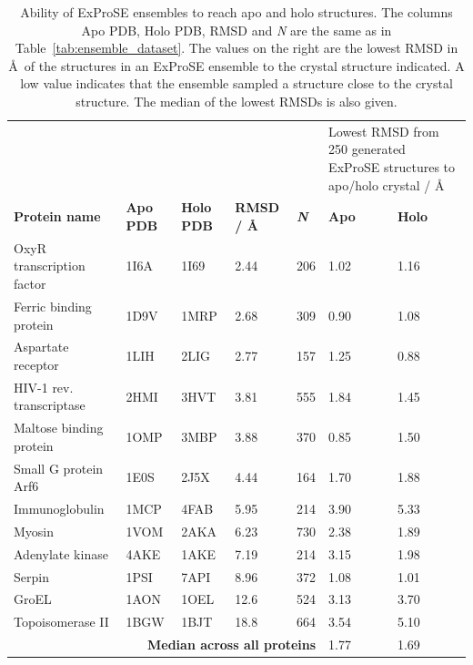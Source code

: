 \begin{table}
\centering

\begin{footnotesize}
\begin{tabular}{ l l l l l l l }
\hline
 &  &  &  &  & \multicolumn{2}{p{3.5cm}}{Lowest RMSD from 250 generated ExProSE structures to apo/holo crystal / \AA} \\
\textbf{Protein name} & \textbf{Apo PDB} & \textbf{Holo PDB} & \textbf{RMSD / \AA} & \textit{\textbf{N}} & \textbf{Apo} & \textbf{Holo} \\
\hline
OxyR transcription factor & 1I6A & 1I69 & 2.44 & 206 & 1.02 & 1.16 \\
Ferric binding protein    & 1D9V & 1MRP & 2.68 & 309 & 0.90 & 1.08 \\
Aspartate receptor        & 1LIH & 2LIG & 2.77 & 157 & 1.25 & 0.88 \\
HIV-1 rev. transcriptase  & 2HMI & 3HVT & 3.81 & 555 & 1.84 & 1.45 \\
Maltose binding protein   & 1OMP & 3MBP & 3.88 & 370 & 0.85 & 1.50 \\
Small G protein Arf6      & 1E0S & 2J5X & 4.44 & 164 & 1.70 & 1.88 \\
Immunoglobulin            & 1MCP & 4FAB & 5.95 & 214 & 3.90 & 5.33 \\
Myosin                    & 1VOM & 2AKA & 6.23 & 730 & 2.38 & 1.89 \\
Adenylate kinase          & 4AKE & 1AKE & 7.19 & 214 & 3.15 & 1.98 \\
Serpin                    & 1PSI & 7API & 8.96 & 372 & 1.08 & 1.01 \\
GroEL                     & 1AON & 1OEL & 12.6 & 524 & 3.13 & 3.70 \\
Topoisomerase II          & 1BGW & 1BJT & 18.8 & 664 & 3.54 & 5.10 \\
\hline
\multicolumn{5}{r}{\textbf{Median across all proteins}} & 1.77  & 1.69 \\
\hline
\end{tabular}
\end{footnotesize}


\caption[Ability of ExProSE ensembles to sample conformational space]
{Ability of ExProSE ensembles to reach apo and holo structures.
The columns Apo PDB, Holo PDB, RMSD and \textit{N} are the same as in Table~\ref{tab:ensemble_dataset}.
The values on the right are the lowest RMSD in \AA\ of the structures in an ExProSE ensemble to the crystal structure indicated.
A low value indicates that the ensemble sampled a structure close to the crystal structure.
The median of the lowest RMSDs is also given.}

\label{tab:ensemble_dataset_ex}
\end{table}


